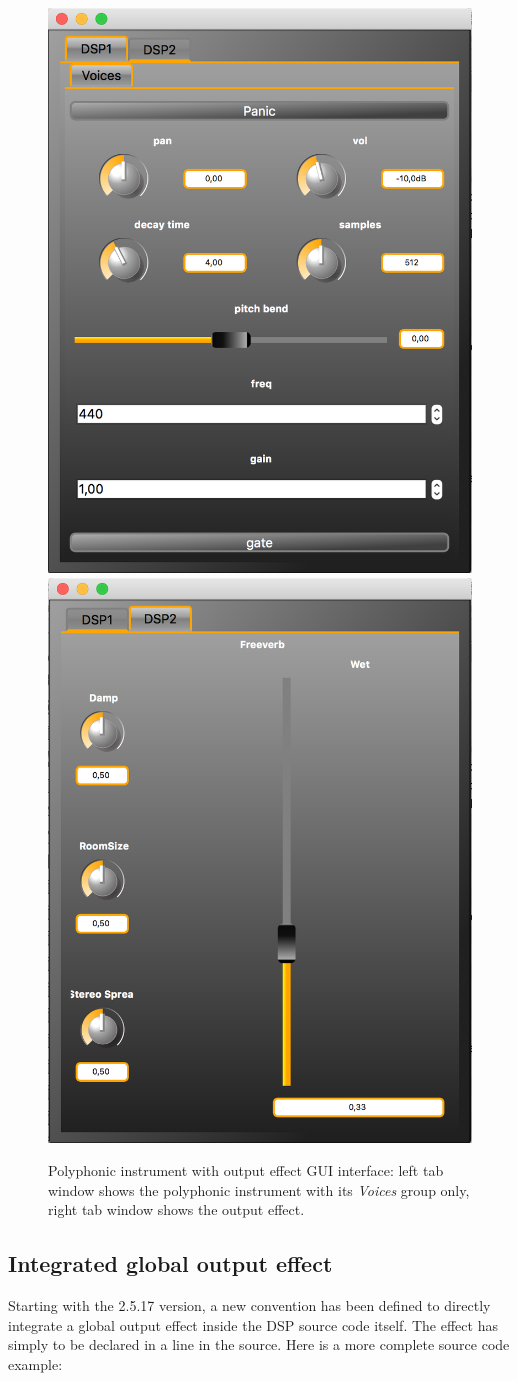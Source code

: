 \begin{figure}[!ht]
\begin{center}
\includegraphics[width=0.48\columnwidth]{images/poly_ui_effect1}
\includegraphics[width=0.48\columnwidth]{images/poly_ui_effect2}
\caption{\footnotesize Polyphonic instrument with output effect GUI interface: left tab window shows the polyphonic instrument with its {\it Voices} group only, right tab window shows the output effect.}
\label{fig:poly-ui-effect}
\end{center}
\end{figure}

\subsection{Integrated global output effect}

Starting with the 2.5.17 version, a new convention has been defined to directly integrate a global output effect inside the DSP source code itself. The effect has simply to be declared in a  line in the source. Here is a more complete source code example:

